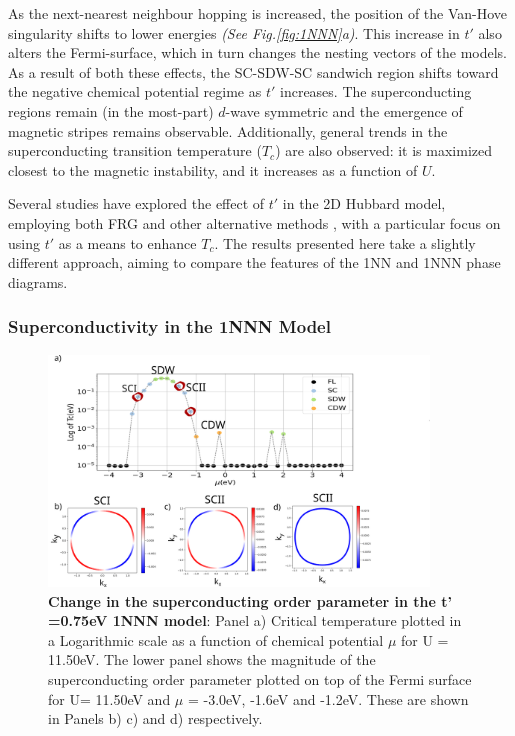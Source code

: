 \documentclass[12pt]{article}
\begin{document}
\noindent
As the next-nearest neighbour hopping is increased, the position of the Van-Hove singularity shifts to lower energies \textit{(See Fig.\ref{fig:1NNN}a)}. 
This increase in $t'$ also alters the Fermi-surface, which in turn changes the nesting vectors of the models. 
As a result of both these effects, the SC-SDW-SC sandwich 
region shifts toward the negative chemical potential regime as $t'$ increases.
The superconducting regions remain (in the most-part) $d$-wave symmetric and the emergence of 
magnetic stripes remains observable. Additionally, general trends in the superconducting transition
temperature ($T_c$) are also observed: it is maximized closest to the 
magnetic instability, and it increases as a function of $U$.\par
\medskip
\noindent Several studies have explored the effect of $t'$ in the 2D Hubbard model, 
employing both FRG \cite{husemann2012incommensurate} and other alternative methods \cite{fontenele2025effects}, 
with a particular focus on using $t'$ as a means to enhance $T_c$. The results presented here take a slightly different approach, aiming to 
compare the features of the 1NN and 1NNN phase diagrams.



\subsubsection{Superconductivity in the 1NNN Model}
\label{subsubsec:SC1NNN}

\begin{figure}[htbp]  %
    \centering
    \includegraphics[width=0.90\textwidth]{1NNNSC_075.png}  %
    \caption{\textbf{Change in the superconducting order parameter in the t' =0.75eV 1NNN model}: Panel a) Critical temperature plotted in a Logarithmic scale
    as a function of chemical potential $\mu$ for U = 11.50eV.
    The lower panel shows the magnitude of the superconducting order parameter plotted on top of the Fermi surface for U= 11.50eV and $\mu$ = -3.0eV, -1.6eV and -1.2eV. These are shown in Panels b)
    c) and d) respectively.  }
    \label{fig:1NNNSC}
\end{figure}
\end{document}
